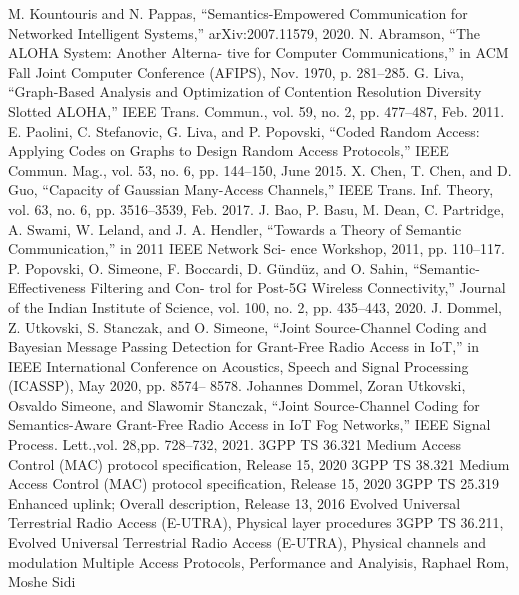 \begin{thebibliography}{9}
M. Kountouris and N. Pappas, “Semantics-Empowered Communication for Networked Intelligent Systems,” arXiv:2007.11579, 2020.
N. Abramson, “The ALOHA System: Another Alterna- tive for Computer Communications,” in ACM Fall Joint Computer Conference (AFIPS), Nov. 1970, p. 281–285.
G. Liva, “Graph-Based Analysis and Optimization of Contention Resolution Diversity Slotted ALOHA,” IEEE Trans. Commun., vol. 59, no. 2, pp. 477–487, Feb. 2011.
E. Paolini, C. Stefanovic, G. Liva, and P. Popovski, “Coded Random Access: Applying Codes on Graphs to Design Random Access Protocols,” IEEE Commun. Mag., vol. 53, no. 6, pp. 144–150, June 2015.
X. Chen, T. Chen, and D. Guo, “Capacity of Gaussian Many-Access Channels,” IEEE Trans. Inf. Theory, vol. 63, no. 6, pp. 3516–3539, Feb. 2017.
J. Bao, P. Basu, M. Dean, C. Partridge, A. Swami, W. Leland, and J. A. Hendler, “Towards a Theory of Semantic Communication,” in 2011 IEEE Network Sci- ence Workshop, 2011, pp. 110–117.
P. Popovski, O. Simeone, F. Boccardi, D. Gündüz, and O. Sahin, “Semantic-Effectiveness Filtering and Con- trol for Post-5G Wireless Connectivity,” Journal of the Indian Institute of Science, vol. 100, no. 2, pp. 435–443, 2020.
J. Dommel, Z. Utkovski, S. Stanczak, and O. Simeone, “Joint Source-Channel Coding and Bayesian Message Passing Detection for Grant-Free Radio Access in IoT,” in IEEE International Conference on Acoustics, Speech and Signal Processing (ICASSP), May 2020, pp. 8574– 8578.
Johannes Dommel, Zoran Utkovski, Osvaldo Simeone, and Slawomir Stanczak, “Joint Source-Channel Coding for Semantics-Aware Grant-Free Radio Access in IoT Fog Networks,” IEEE Signal Process. Lett.,vol. 28,pp. 728–732, 2021.
3GPP TS 36.321 Medium Access Control (MAC) protocol specification, Release 15, 2020
3GPP TS 38.321 Medium Access Control (MAC) protocol specification, Release 15, 2020
3GPP TS 25.319 Enhanced uplink; Overall description, Release 13, 2016
Evolved Universal Terrestrial Radio Access (E-UTRA), Physical layer procedures 
3GPP TS 36.211, Evolved Universal Terrestrial Radio Access (E-UTRA), Physical channels and modulation
Multiple Access Protocols, Performance and Analyisis, Raphael Rom, Moshe Sidi 

\end{thebibliography}

